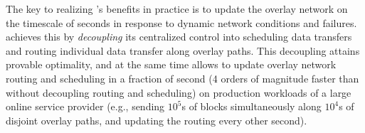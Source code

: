 

The key to realizing \name's benefits in practice is to update
the overlay network on the timescale of seconds in response to dynamic network conditions
and failures. \name achieves this by {\em decoupling} its centralized control
into scheduling data transfers and
routing individual data transfer along overlay paths.
This decoupling attains provable optimality, and at the same time
allows \name to update overlay network routing and scheduling in
a fraction of second (4 orders of magnitude faster than without decoupling
routing and scheduling) on production workloads
of a large online service provider (e.g., sending $10^5$s of blocks
simultaneously along $10^4$s of disjoint overlay paths, and updating
the routing every other second).


